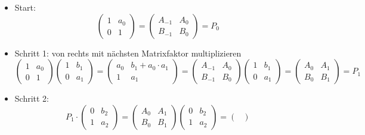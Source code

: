 \begin{itemize}
\item Start:
\begin{equation*}
		\begin{pmatrix}
			1& a_0\\
			0& 1
		\end{pmatrix}
	=	\begin{pmatrix}
			A_{-1}& A_0\\
			B_{-1}& B_0
		\end{pmatrix}
	=	P_0
\end{equation*}
\item Schritt 1: von rechts mit nächsten Matrixfaktor multiplizieren
\begin{equation*}
		\begin{pmatrix}
			1& a_0\\
			0& 1
		\end{pmatrix}
		\begin{pmatrix}
			1& b_1\\
			0& a_1
		\end{pmatrix}
	=	\begin{pmatrix}
			a_0& b_1 + a_0 \cdot a_1\\
			1&	a_1
		\end{pmatrix}
	=	\begin{pmatrix}
			A_{-1}& A_0\\
			B_{-1}& B_0
		\end{pmatrix}
		\begin{pmatrix}
			1& b_1\\
			0& a_1
		\end{pmatrix}
	=	\begin{pmatrix}
			A_0& A_1\\
			B_0& B_1
		\end{pmatrix}
	=	P_1
\end{equation*}
\item Schritt 2:
\begin{equation*}
P_1 \cdot	\begin{pmatrix}
				0& b_2\\
				1& a_2
			\end{pmatrix}
		=	\begin{pmatrix}
				A_0& A_1\\
				B_0& B_1
			\end{pmatrix}
			\begin{pmatrix}
				0& b_2\\
				1& a_2
			\end{pmatrix}
		=	\begin{pmatrix}

\end{pmatrix}
\end{equation*}
\end{itemize}
